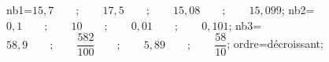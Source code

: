 \documentclass[exercice]{thedocument}%
\begin{document}
%
    \>nb1={$15,7\qquad;\qquad17,5\qquad;\qquad15,08\qquad;\qquad15,099$};%
    \>nb2={$0,1\qquad;\qquad10\qquad;\qquad0,01\qquad;\qquad0,101$};%
    \>nb3={$58,9\qquad;\qquad\dfrac{582}{100}\qquad;\qquad5,89\qquad;\qquad\dfrac{58}{10}$};%
    \>ordre=décroissant;%
\end{document}
